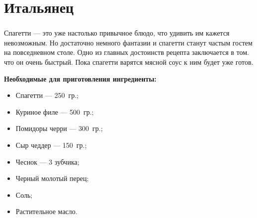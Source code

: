 \documentclass[t]{beamer}  %
\begin{document}
\begin{frame}
{\begin{enumerate}
	\end{enumerate}
	}
\end{frame}

\section{Итальянец}
\begin{frame} %
	\frametitle{\insertsection}
	Спагетти --- это уже настолько привычное блюдо, что удивить им кажется невозможным. Но достаточно немного фантазии и спагетти станут частым гостем на повседневном столе. Одно из главных достоинств рецепта заключается в том. что он очень быстрый. Пока спагетти варятся мясной соус к ним будет уже готов. \pause
	
	\textbf{Необходимые для приготовления ингредиенты:}
	\begin{multicols}{2}
		\begin{itemize}
			\item Спагетти --- 250~гр.;
			\item Куриное филе --- 500~гр.;
			\item Помидоры черри --- 300~гр.;
			\item Сыр чеддер --- 150~гр.;
			\item Чеснок --- 3 зубчика;
			\item Черный молотый перец;
			\item Соль;
			\item Растительное масло.
		\end{itemize}	
	\end{multicols}
\end{frame}	
\end{document}
